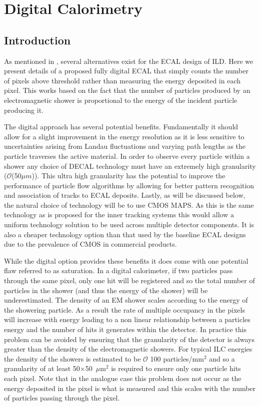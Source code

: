 \chapter{Digital Calorimetry}
\label{sect:DECAL}

\section{Introduction}
As mentioned in , several alternatives exist for the \ac{ECAL} design of \ac{ILD}. Here we present details of a proposed fully digital \ac{ECAL} that simply counts the number of pixels above threshold rather than measuring the energy deposited in each pixel. This works based on the fact that the number of particles produced by an electromagnetic shower is proportional to the energy of the incident particle producing it.

The digital approach has several potential benefits. Fundamentally it should allow for a slight improvement in the energy resolution as it is less sensitive to uncertainties arising from Landau fluctuations and varying path lengths as the particle traverses the active material. In order to observe every particle within a shower any choice of \ac{DECAL} technology must have an extremely high granularity ($\mathcal{O}$(50$\mu m$)). This ultra high granularity has the potential to improve the performance of particle flow algorithms by allowing for better pattern recognition and association of tracks to \ac{ECAL} deposits. Lastly, as will be discussed below, the natural choice of technology will be to use \ac{CMOS} \ac{MAPS}. As this is the same technology as is proposed for the inner tracking systems this would allow a uniform technology solution to be used across multiple detector components. It is also a cheaper technology option than that used by the baseline \ac{ECAL} designs due to the prevalence of \ac{CMOS} in commercial products.

While the digital option provides these benefits it does come with one potential flaw referred to as saturation. In a digital calorimeter, if two particles pass through the same pixel, only one hit will be registered and so the total number of particles in the shower (and thus the energy of the shower) will be underestimated. The density of an EM shower scales according to the energy of the showering particle. As a result the rate of multiple occupancy in the pixels will increase with energy leading to a non linear relationship between a particles energy and the number of hits it generates within the detector. In practice this problem can be avoided by ensuring that the granularity of the detector is always greater than the density of the electromagnetic showers. For typical \ac{ILC} energies the density of the showers is estimated to be $\mathcal{O}$ 100 particles/mm$^2$ and so a granularity of at least 50$\times$50~$\mu$m$^2$ is required to ensure only one particle hits each pixel. Note that in the analogue case this problem does not occur as the energy deposited in the pixel is what is measured and this scales with the number of particles passing through the pixel.

